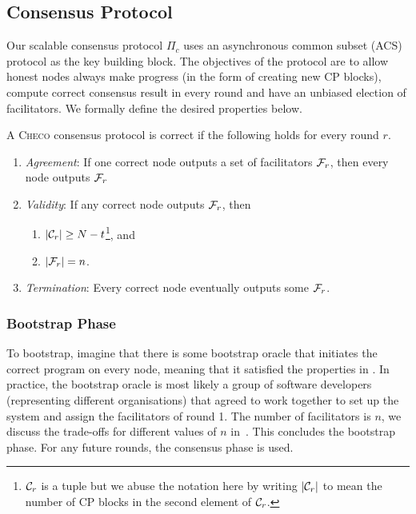 \subsection{Consensus Protocol}
Our scalable consensus protocol $\Pi_c$ uses an asynchronous common subset (ACS) protocol as the key building block.
The objectives of the protocol are to
allow honest nodes always make progress (in the form of creating new CP blocks),
compute correct consensus result in every round
and have an unbiased election of facilitators.
We formally define the desired properties below.
\begin{definition}\label{def:consensus}
A \textsc{Checo} consensus protocol is correct if the following holds for every round $r$.
\begin{enumerate}
    \item \emph{Agreement}:
        If one correct node outputs a set of facilitators $\mathcal{F}_r$,
        then every node outputs $\mathcal{F}_r$
    \item \emph{Validity}:
        If any correct node outputs $\mathcal{F}_r$, then 
            \begin{enumerate}
                \item $|\mathcal{C}_r| \ge N - t$\footnote{
                $\mathcal{C}_r$ is a tuple but we abuse the notation here by writing $|\mathcal{C}_r|$ to mean the number of CP blocks in the second element of $\mathcal{C}_r$.}, and
                \item $|\mathcal{F}_r| = n$.
            \end{enumerate}
    \item \emph{Termination}:
        Every correct node eventually outputs some $\mathcal{F}_r$.
\end{enumerate}
\end{definition}

\subsubsection{Bootstrap Phase}
\label{sec:bootstrap}
To bootstrap, imagine that there is some bootstrap oracle that initiates the correct program on every node,
meaning that it satisfied the properties in .
In practice, the bootstrap oracle is most likely a group of software developers
(representing different organisations)
that agreed to work together to set up the system and assign the facilitators of round 1.
The number of facilitators is $n$, we discuss the trade-offs for different values of $n$ in~.
This concludes the bootstrap phase.
For any future rounds, the consensus phase is used.


